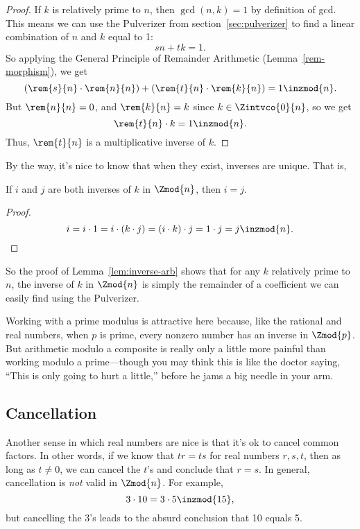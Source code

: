 \begin{proof}
If $k$ is relatively prime to $n$, then $\gcd(n, k) = 1$ by definition
of gcd.  This means we can use the Pulverizer from
section~\ref{sec:pulverizer} to find a linear combination of $n$ and
$k$ equal to 1:
\[
s n + t k = 1.
\]
So applying the General Principle of Remainder Arithmetic
(Lemma~\ref{rem-morphism}), we get
\[
(\rem{s}{n} \cdot \rem{n}{n}) + (\rem{t}{n} \cdot \rem{k}{n}) = 1 \inzmod{n}.
\]
But $\rem{n}{n} = 0$, and $\rem{k}{n} = k$ since $k \in \Zintvco{0}{n}$, so we
  get
\[
\rem{t}{n} \cdot k = 1 \inzmod{n}.
\]
Thus, $\rem{t}{n}$ is a multiplicative inverse of $k$.
\end{proof}

By the way, it's nice to know that when they exist, inverses are
unique.  That is,
\begin{lemma}\label{uniq-inv}
If $i$ and $j$ are both inverses of $k$ in $\Zmod{n}$, then $i=j$.
\end{lemma}

\begin{proof}
\[
i = i \cdot 1 = i \cdot (k \cdot j) = (i \cdot k) \cdot j = 1 \cdot j = j \inzmod{n}.
\]
\end{proof}

So the proof of Lemma~\ref{lem:inverse-arb} shows that for any $k$
relatively prime to $n$, the inverse of $k$ in $\Zmod{n}$ is simply
the remainder of a coefficient we can easily find using the
Pulverizer.

Working with a prime modulus is attractive here because, like the
rational and real numbers, when $p$ is prime, every nonzero number has
an inverse in $\Zmod{p}$.  But arithmetic modulo a composite is really
only a little more painful than working modulo a prime---though you
may think this is like the doctor saying, ``This is only going to hurt
a little,'' before he jams a big needle in your arm.

\subsection{Cancellation}

Another sense in which real numbers are nice is that it's ok to cancel
common factors.  In other words, if we know that $t r = t s$ for real
numbers $r,s,t$, then as long as $t \neq 0$, we can cancel the $t$'s
and conclude that $r = s$.  In general, cancellation is \emph{not}
valid in $\Zmod{n}$.  For example,
\begin{equation}\label{3103515}
3 \cdot 10 = 3 \cdot 5 \inzmod{15},
\end{equation}
but cancelling the 3's leads to the absurd conclusion that 10 equals
5.

